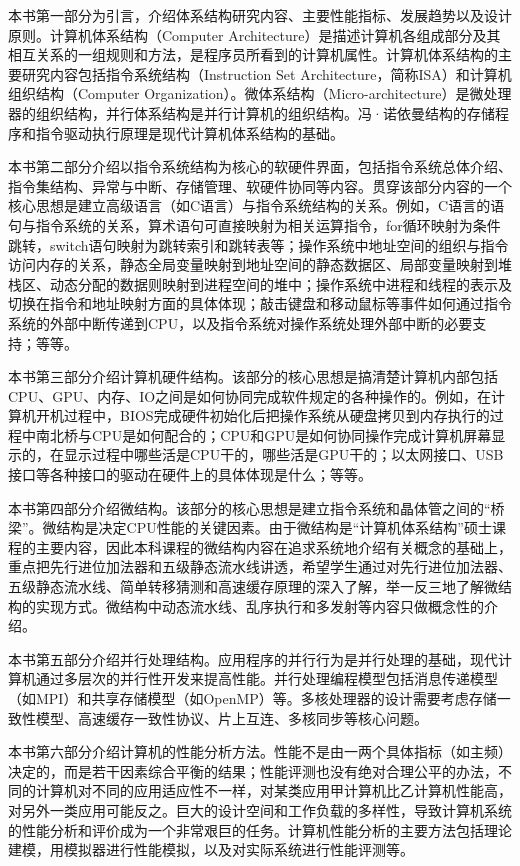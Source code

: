 \documentclass[]{ctexbook}
\begin{document}
本书第一部分为引言，介绍体系结构研究内容、主要性能指标、发展趋势以及设计原则。计算机体系结构（Computer Architecture）是描述计算机各组成部分及其相互关系的一组规则和方法，是程序员所看到的计算机属性。计算机体系结构的主要研究内容包括指令系统结构（Instruction Set Architecture，简称ISA）和计算机组织结构（Computer Organization）。微体系结构（Micro-architecture）是微处理器的组织结构，并行体系结构是并行计算机的组织结构。冯·诺依曼结构的存储程序和指令驱动执行原理是现代计算机体系结构的基础。

本书第二部分介绍以指令系统结构为核心的软硬件界面，包括指令系统总体介绍、指令集结构、异常与中断、存储管理、软硬件协同等内容。贯穿该部分内容的一个核心思想是建立高级语言（如C语言）与指令系统结构的关系。例如，C语言的语句与指令系统的关系，算术语句可直接映射为相关运算指令，for循环映射为条件跳转，switch语句映射为跳转索引和跳转表等；操作系统中地址空间的组织与指令访问内存的关系，静态全局变量映射到地址空间的静态数据区、局部变量映射到堆栈区、动态分配的数据则映射到进程空间的堆中；操作系统中进程和线程的表示及切换在指令和地址映射方面的具体体现；敲击键盘和移动鼠标等事件如何通过指令系统的外部中断传递到CPU，以及指令系统对操作系统处理外部中断的必要支持；等等。

本书第三部分介绍计算机硬件结构。该部分的核心思想是搞清楚计算机内部包括CPU、GPU、内存、IO之间是如何协同完成软件规定的各种操作的。例如，在计算机开机过程中，BIOS完成硬件初始化后把操作系统从硬盘拷贝到内存执行的过程中南北桥与CPU是如何配合的；CPU和GPU是如何协同操作完成计算机屏幕显示的，在显示过程中哪些活是CPU干的，哪些活是GPU干的；以太网接口、USB接口等各种接口的驱动在硬件上的具体体现是什么；等等。

本书第四部分介绍微结构。该部分的核心思想是建立指令系统和晶体管之间的``桥梁''。微结构是决定CPU性能的关键因素。由于微结构是``计算机体系结构''硕士课程的主要内容，因此本科课程的微结构内容在追求系统地介绍有关概念的基础上，重点把先行进位加法器和五级静态流水线讲透，希望学生通过对先行进位加法器、五级静态流水线、简单转移猜测和高速缓存原理的深入了解，举一反三地了解微结构的实现方式。微结构中动态流水线、乱序执行和多发射等内容只做概念性的介绍。

本书第五部分介绍并行处理结构。应用程序的并行行为是并行处理的基础，现代计算机通过多层次的并行性开发来提高性能。并行处理编程模型包括消息传递模型（如MPI）和共享存储模型（如OpenMP）等。多核处理器的设计需要考虑存储一致性模型、高速缓存一致性协议、片上互连、多核同步等核心问题。

本书第六部分介绍计算机的性能分析方法。性能不是由一两个具体指标（如主频）决定的，而是若干因素综合平衡的结果；性能评测也没有绝对合理公平的办法，不同的计算机对不同的应用适应性不一样，对某类应用甲计算机比乙计算机性能高，对另外一类应用可能反之。巨大的设计空间和工作负载的多样性，导致计算机系统的性能分析和评价成为一个非常艰巨的任务。计算机性能分析的主要方法包括理论建模，用模拟器进行性能模拟，以及对实际系统进行性能评测等。
\end{document}
